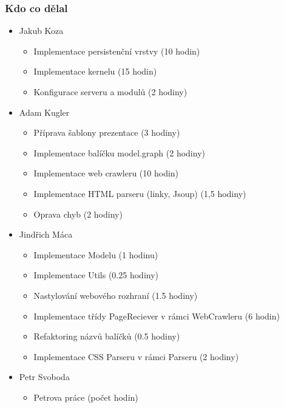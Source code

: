 \documentclass{beamer}
\begin{document}
\begin{frame}[allowframebreaks]\frametitle{Kdo co dělal} 
  \begin{itemize}
    \item Jakub Koza
      \begin{itemize}
       \item Implementace persistenční vrstvy (10 hodin)
       \item Implementace kernelu (15 hodin)
       \item Konfigurace serveru a modulů (2 hodiny)
     \end{itemize}    

    \item Adam Kugler
      \begin{itemize}
       \item Příprava šablony prezentace (3 hodiny)
       \item Implementace balíčku model.graph (2 hodiny)
       \item Implementace web crawleru (10 hodin)
       \item Implementace HTML parseru (linky, Jsoup) (1,5 hodiny)
       \item Oprava chyb (2 hodiny)
     \end{itemize}

    \item Jindřich Máca
      \begin{itemize}
       \item Implementace Modelu (1 hodinu)
			 \item Implementace Utils (0.25 hodiny)
			 \item Nastylování webového rozhraní (1.5 hodiny)
			 \item Implementace třídy PageReciever v rámci WebCrawleru (6 hodin)
			 \item Refaktoring názvů balíčků (0.5 hodiny)
			 \item Implementace CSS Parseru v rámci Parseru (2 hodiny)
     \end{itemize}

    \item Petr Svoboda
      \begin{itemize}
       \item Petrova práce (počet hodin)
     \end{itemize}
   \end{itemize}  
\end{frame} 
\end{document}
